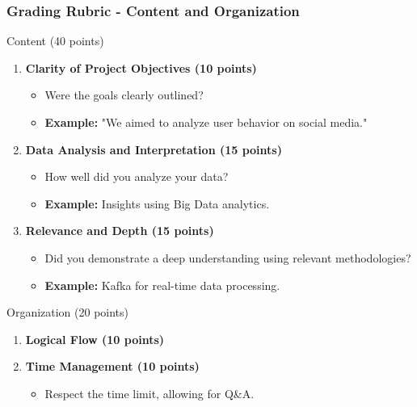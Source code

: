 \documentclass[aspectratio=169]{beamer}
\begin{document}
\begin{frame}[fragile]
    \frametitle{Grading Rubric - Content and Organization}
    \begin{block}{Content (40 points)}
        \begin{enumerate}
            \item \textbf{Clarity of Project Objectives (10 points)}
                \begin{itemize}
                    \item Were the goals clearly outlined?
                    \item \textbf{Example:} "We aimed to analyze user behavior on social media."
                \end{itemize}
            \item \textbf{Data Analysis and Interpretation (15 points)}
                \begin{itemize}
                    \item How well did you analyze your data?
                    \item \textbf{Example:} Insights using Big Data analytics.
                \end{itemize}
            \item \textbf{Relevance and Depth (15 points)}
                \begin{itemize}
                    \item Did you demonstrate a deep understanding using relevant methodologies?
                    \item \textbf{Example:} Kafka for real-time data processing.
                \end{itemize}
        \end{enumerate}
    \end{block}

    \begin{block}{Organization (20 points)}
        \begin{enumerate}
            \item \textbf{Logical Flow (10 points)}
            \item \textbf{Time Management (10 points)}
                \begin{itemize}
                    \item Respect the time limit, allowing for Q\&A.
                \end{itemize}
        \end{enumerate}
    \end{block}
\end{frame}
\end{document}
